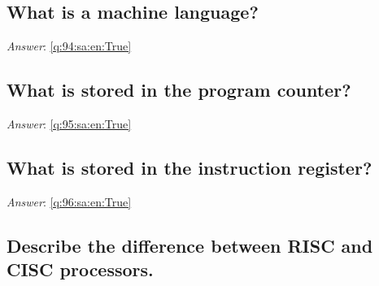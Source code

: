 \documentclass[a4paper,11pt,oneside]{article}
\begin{document}
\begin{sloppypar}
\subsection{What is a machine language?}

\label{q:94:sa:en:False}

\vspace{2cm}

\noindent\makebox[\textwidth]{\hrulefill}

\vspace{1cm}

\textit{Answer}: \autoref{q:94:sa:en:True}



\subsection{What is stored in the program counter?}

\label{q:95:sa:en:False}

\vspace{2cm}

\noindent\makebox[\textwidth]{\hrulefill}

\vspace{1cm}

\textit{Answer}: \autoref{q:95:sa:en:True}



\subsection{What is stored in the instruction register?}

\label{q:96:sa:en:False}

\vspace{2cm}

\noindent\makebox[\textwidth]{\hrulefill}

\vspace{1cm}

\textit{Answer}: \autoref{q:96:sa:en:True}



\subsection{Describe the difference between RISC and CISC processors.}

\label{q:97:sa:en:False}

\vspace{2cm}

\noindent\makebox[\textwidth]{\hrulefill}


\end{sloppypar}
\end{document}
